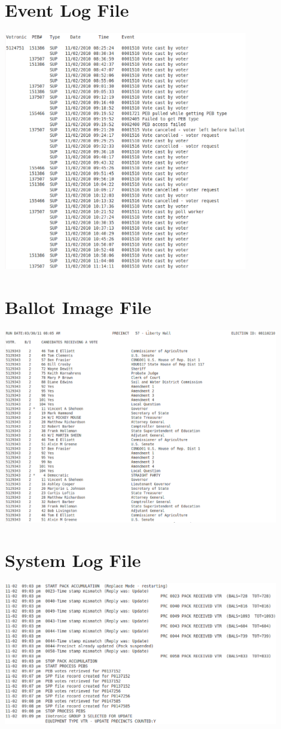 \documentclass[letterpaper,twocolumn,10pt]{article}
\begin{document}
\clearpage
\onecolumn
\begin{center}
\appendix
\section{Event Log File}\label{app:el} 
\includegraphics[width=0.8\textwidth]{eventLog.eps}

\clearpage
\section{Ballot Image File}\label{app:bi}
\includegraphics[width=0.9\textwidth]{ballot.eps}

\clearpage
\section{System Log File}\label{app:sl}
\includegraphics[width=0.9\textwidth]{system.eps}
\end{center}

\end{document}
